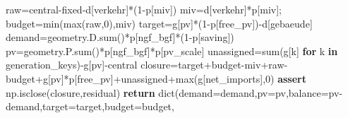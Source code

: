 \documentclass[
  ngerman,
  a4paper,
  DIV=11]{scrreprt}
\newenvironment{Shaded}{\begin{snugshade}}{\end{snugshade}}
\newcommand{\BuiltInTok}[1]{\textcolor[rgb]{0.00,0.23,0.31}{#1}}
\newcommand{\ControlFlowTok}[1]{\textcolor[rgb]{0.00,0.23,0.31}{\textbf{#1}}}
\newcommand{\DecValTok}[1]{\textcolor[rgb]{0.68,0.00,0.00}{#1}}
\newcommand{\KeywordTok}[1]{\textcolor[rgb]{0.00,0.23,0.31}{\textbf{#1}}}
\newcommand{\NormalTok}[1]{\textcolor[rgb]{0.00,0.23,0.31}{#1}}
\newcommand{\OperatorTok}[1]{\textcolor[rgb]{0.37,0.37,0.37}{#1}}
\newcommand{\StringTok}[1]{\textcolor[rgb]{0.13,0.47,0.30}{#1}}
\begin{document}
\begin{Shaded}
\begin{Highlighting}[]
\NormalTok{    raw}\OperatorTok{=}\NormalTok{central}\OperatorTok{{-}}\NormalTok{fixed}\OperatorTok{{-}}\NormalTok{d[}\StringTok{\textquotesingle{}verkehr\textquotesingle{}}\NormalTok{]}\OperatorTok{*}\NormalTok{(}\DecValTok{1}\OperatorTok{{-}}\NormalTok{p[}\StringTok{\textquotesingle{}miv\textquotesingle{}}\NormalTok{])}
\NormalTok{    miv}\OperatorTok{=}\NormalTok{d[}\StringTok{\textquotesingle{}verkehr\textquotesingle{}}\NormalTok{]}\OperatorTok{*}\NormalTok{p[}\StringTok{\textquotesingle{}miv\textquotesingle{}}\NormalTok{]}\OperatorTok{;}\NormalTok{ budget}\OperatorTok{=}\BuiltInTok{min}\NormalTok{(}\BuiltInTok{max}\NormalTok{(raw,}\DecValTok{0}\NormalTok{),miv)}
\NormalTok{    target}\OperatorTok{=}\NormalTok{g[}\StringTok{\textquotesingle{}pv\textquotesingle{}}\NormalTok{]}\OperatorTok{*}\NormalTok{(}\DecValTok{1}\OperatorTok{{-}}\NormalTok{p[}\StringTok{\textquotesingle{}free\_pv\textquotesingle{}}\NormalTok{])}\OperatorTok{{-}}\NormalTok{d[}\StringTok{\textquotesingle{}gebaeude\textquotesingle{}}\NormalTok{]}
\NormalTok{    demand}\OperatorTok{=}\NormalTok{geometry.D.}\BuiltInTok{sum}\NormalTok{()}\OperatorTok{*}\NormalTok{p[}\StringTok{\textquotesingle{}ngf\_bgf\textquotesingle{}}\NormalTok{]}\OperatorTok{*}\NormalTok{(}\DecValTok{1}\OperatorTok{{-}}\NormalTok{p[}\StringTok{\textquotesingle{}saving\textquotesingle{}}\NormalTok{])}
\NormalTok{    pv}\OperatorTok{=}\NormalTok{geometry.P.}\BuiltInTok{sum}\NormalTok{()}\OperatorTok{*}\NormalTok{p[}\StringTok{\textquotesingle{}ngf\_bgf\textquotesingle{}}\NormalTok{]}\OperatorTok{*}\NormalTok{p[}\StringTok{\textquotesingle{}pv\_scale\textquotesingle{}}\NormalTok{]}
\NormalTok{    unassigned}\OperatorTok{=}\BuiltInTok{sum}\NormalTok{(g[k] }\ControlFlowTok{for}\NormalTok{ k }\KeywordTok{in}\NormalTok{ generation\_keys)}\OperatorTok{{-}}\NormalTok{g[}\StringTok{\textquotesingle{}pv\textquotesingle{}}\NormalTok{]}\OperatorTok{{-}}\NormalTok{central}
\NormalTok{    closure}\OperatorTok{=}\NormalTok{target}\OperatorTok{+}\NormalTok{budget}\OperatorTok{{-}}\NormalTok{miv}\OperatorTok{+}\NormalTok{raw}\OperatorTok{{-}}\NormalTok{budget}\OperatorTok{+}\NormalTok{g[}\StringTok{\textquotesingle{}pv\textquotesingle{}}\NormalTok{]}\OperatorTok{*}\NormalTok{p[}\StringTok{\textquotesingle{}free\_pv\textquotesingle{}}\NormalTok{]}\OperatorTok{+}\NormalTok{unassigned}\OperatorTok{+}\BuiltInTok{max}\NormalTok{(g[}\StringTok{\textquotesingle{}net\_imports\textquotesingle{}}\NormalTok{],}\DecValTok{0}\NormalTok{)}
    \ControlFlowTok{assert}\NormalTok{ np.isclose(closure,residual)}
    \ControlFlowTok{return} \BuiltInTok{dict}\NormalTok{(demand}\OperatorTok{=}\NormalTok{demand,pv}\OperatorTok{=}\NormalTok{pv,balance}\OperatorTok{=}\NormalTok{pv}\OperatorTok{{-}}\NormalTok{demand,target}\OperatorTok{=}\NormalTok{target,budget}\OperatorTok{=}\NormalTok{budget,}

\end{Highlighting}
\end{Shaded}
\end{document}
